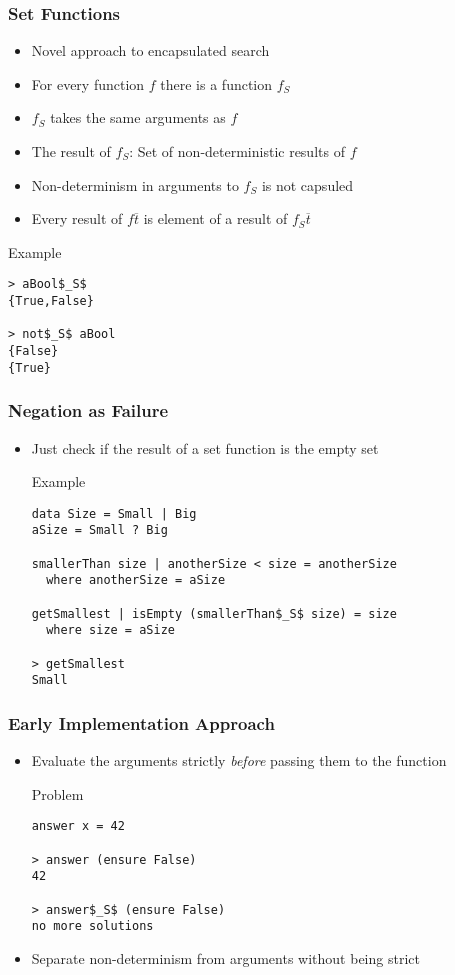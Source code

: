\documentclass[utf8]{beamer}
\begin{document}
\begin{frame}[fragile]
\frametitle{Set Functions}
\begin{itemize}
\item Novel approach to encapsulated search
\item For every function $f$ there is a function $f_S$
\item $f_S$ takes the same arguments as $f$
\item The result of $f_S$: Set of non-deterministic results of $f$
\item Non-determinism in arguments to $f_S$ is not capsuled
\item Every result of $f \overline{t}$ is element of a
      result of $f_S \overline{t}$
\end{itemize}
\begin{block}{Example}
\begin{lstlisting}[mathescape]
> aBool$_S$ 
{True,False}

> not$_S$ aBool
{False}
{True}
\end{lstlisting}
\end{block} 
\end{frame}






\begin{frame}[fragile]
\frametitle{Negation as Failure}
\begin{itemize}
\item Just check if the result of a set function is the empty set
\begin{block}{Example}
\begin{lstlisting}[mathescape]
data Size = Small | Big
aSize = Small ? Big

smallerThan size | anotherSize < size = anotherSize
  where anotherSize = aSize

getSmallest | isEmpty (smallerThan$_S$ size) = size
  where size = aSize

> getSmallest
Small
\end{lstlisting}
\end{block}
\end{itemize}
\end{frame}

\begin{frame}[fragile]
\frametitle{Early Implementation Approach}
\begin{itemize}
\item Evaluate the arguments strictly \emph{before}
      passing them to the function
\pause
\begin{block}{Problem}
\begin{lstlisting}[mathescape]
answer x = 42

> answer (ensure False)
42

> answer$_S$ (ensure False)
no more solutions
\end{lstlisting}
\end{block}
\item Separate non-determinism from arguments without being strict
\end{itemize}
\end{frame}
\end{document}
